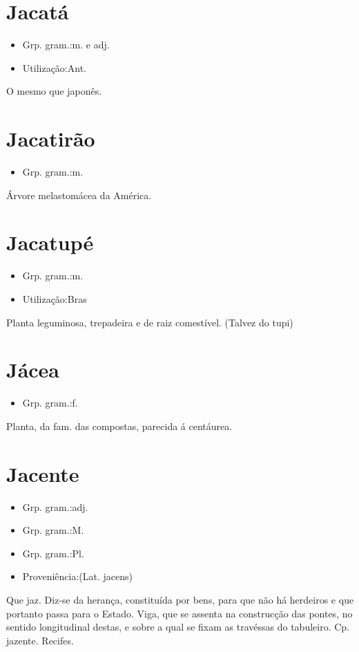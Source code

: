 \documentclass{article}
\begin{document}
\section{Jacatá}
\begin{itemize}
\item {Grp. gram.:m.  e  adj.}
\end{itemize}
\begin{itemize}
\item {Utilização:Ant.}
\end{itemize}
O mesmo que \textunderscore japonês\textunderscore .
\section{Jacatirão}
\begin{itemize}
\item {Grp. gram.:m.}
\end{itemize}
Árvore melastomácea da América.
\section{Jacatupé}
\begin{itemize}
\item {Grp. gram.:m.}
\end{itemize}
\begin{itemize}
\item {Utilização:Bras}
\end{itemize}
Planta leguminosa, trepadeira e de raiz comestível.
(Talvez do tupi)
\section{Jácea}
\begin{itemize}
\item {Grp. gram.:f.}
\end{itemize}
Planta, da fam. das compostas, parecida á centáurea.
\section{Jacente}
\begin{itemize}
\item {Grp. gram.:adj.}
\end{itemize}
\begin{itemize}
\item {Grp. gram.:M.}
\end{itemize}
\begin{itemize}
\item {Grp. gram.:Pl.}
\end{itemize}
\begin{itemize}
\item {Proveniência:(Lat. \textunderscore jacens\textunderscore )}
\end{itemize}
Que jaz.
Diz-se da herança, constituída por bens, para que não há herdeiros e que portanto passa para o Estado.
Viga, que se assenta na construcção das pontes, no sentido longitudinal destas, e sobre a qual se fixam as travéssas do tabuleiro.
Cp. \textunderscore jazente\textunderscore .
Recifes.
\end{document}
